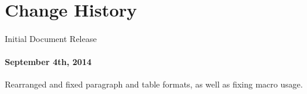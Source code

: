 %
%

\section*{Change History}

\paragraph*{\ReleaseDate}
Initial Document Release

\paragraph*{September 4th, 2014}
Rearranged and fixed paragraph and table formats, as well as fixing \file{\file} macro usage.

